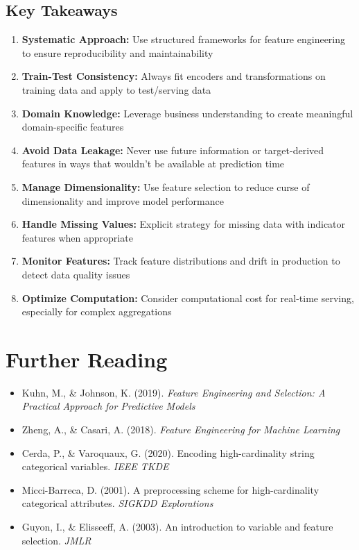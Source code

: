 \subsection{Key Takeaways}

\begin{enumerate}
    \item \textbf{Systematic Approach:} Use structured frameworks for feature engineering to ensure reproducibility and maintainability

    \item \textbf{Train-Test Consistency:} Always fit encoders and transformations on training data and apply to test/serving data

    \item \textbf{Domain Knowledge:} Leverage business understanding to create meaningful domain-specific features

    \item \textbf{Avoid Data Leakage:} Never use future information or target-derived features in ways that wouldn't be available at prediction time

    \item \textbf{Manage Dimensionality:} Use feature selection to reduce curse of dimensionality and improve model performance

    \item \textbf{Handle Missing Values:} Explicit strategy for missing data with indicator features when appropriate

    \item \textbf{Monitor Features:} Track feature distributions and drift in production to detect data quality issues

    \item \textbf{Optimize Computation:} Consider computational cost for real-time serving, especially for complex aggregations
\end{enumerate}

\section{Further Reading}

\begin{itemize}
    \item Kuhn, M., \& Johnson, K. (2019). \textit{Feature Engineering and Selection: A Practical Approach for Predictive Models}
    \item Zheng, A., \& Casari, A. (2018). \textit{Feature Engineering for Machine Learning}
    \item Cerda, P., \& Varoquaux, G. (2020). Encoding high-cardinality string categorical variables. \textit{IEEE TKDE}
    \item Micci-Barreca, D. (2001). A preprocessing scheme for high-cardinality categorical attributes. \textit{SIGKDD Explorations}
    \item Guyon, I., \& Elisseeff, A. (2003). An introduction to variable and feature selection. \textit{JMLR}
\end{itemize}

